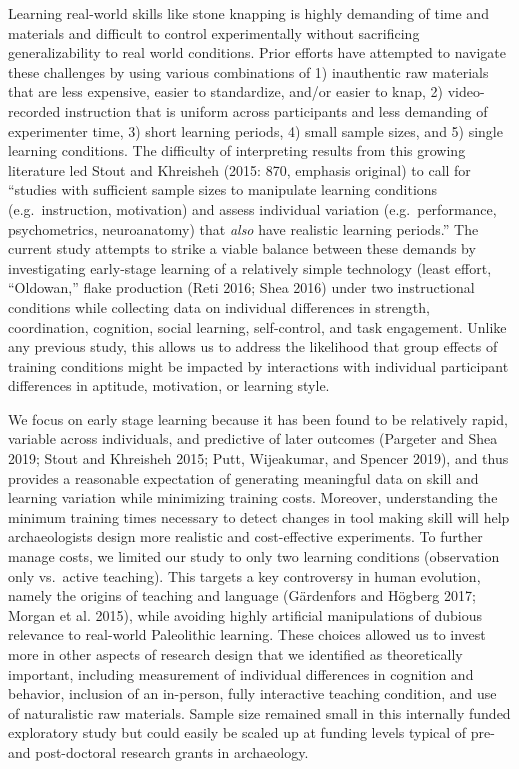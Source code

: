 \documentclass[smallextended]{svjour3}       %
\begin{document}
Learning real-world skills like stone knapping is highly demanding of
time and materials and difficult to control experimentally without
sacrificing generalizability to real world conditions. Prior efforts
have attempted to navigate these challenges by using various
combinations of 1) inauthentic raw materials that are less expensive,
easier to standardize, and/or easier to knap, 2) video-recorded
instruction that is uniform across participants and less demanding of
experimenter time, 3) short learning periods, 4) small sample sizes, and
5) single learning conditions. The difficulty of interpreting results
from this growing literature led Stout and Khreisheh (2015: 870,
emphasis original) to call for ``studies with sufficient sample sizes to
manipulate learning conditions (e.g.~instruction, motivation) and assess
individual variation (e.g.~performance, psychometrics, neuroanatomy)
that \emph{also} have realistic learning periods.'' The current study
attempts to strike a viable balance between these demands by
investigating early-stage learning of a relatively simple technology
(least effort, ``Oldowan,'' flake production (Reti 2016; Shea 2016)
under two instructional conditions while collecting data on individual
differences in strength, coordination, cognition, social learning,
self-control, and task engagement. Unlike any previous study, this
allows us to address the likelihood that group effects of training
conditions might be impacted by interactions with individual participant
differences in aptitude, motivation, or learning style.

We focus on early stage learning because it has been found to be
relatively rapid, variable across individuals, and predictive of later
outcomes (Pargeter and Shea 2019; Stout and Khreisheh 2015; Putt,
Wijeakumar, and Spencer 2019), and thus provides a reasonable
expectation of generating meaningful data on skill and learning
variation while minimizing training costs. Moreover, understanding the
minimum training times necessary to detect changes in tool making skill
will help archaeologists design more realistic and cost-effective
experiments. To further manage costs, we limited our study to only two
learning conditions (observation only vs.~active teaching). This targets
a key controversy in human evolution, namely the origins of teaching and
language (Gärdenfors and Högberg 2017; Morgan et al. 2015), while
avoiding highly artificial manipulations of dubious relevance to
real-world Paleolithic learning. These choices allowed us to invest more
in other aspects of research design that we identified as theoretically
important, including measurement of individual differences in cognition
and behavior, inclusion of an in-person, fully interactive teaching
condition, and use of naturalistic raw materials. Sample size remained
small in this internally funded exploratory study but could easily be
scaled up at funding levels typical of pre- and post-doctoral research
grants in archaeology.
\end{document}
